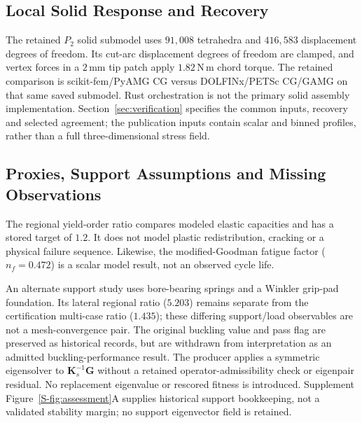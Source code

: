 \subsection{Local Solid Response and Recovery}
\label{subsec:family-solid}
\label{subsec:family-verification}
The retained $P_2$ solid submodel uses $91{,}008$ tetrahedra and $416{,}583$ displacement degrees of freedom. Its cut-arc displacement degrees of freedom are clamped, and vertex forces in a $2\,\mathrm{mm}$ tip patch apply $1.82\,\mathrm{N\,m}$ chord torque. The retained comparison is scikit-fem/PyAMG CG versus DOLFINx/PETSc CG/GAMG on that same saved submodel. Rust orchestration is not the primary solid assembly implementation. Section~\ref{sec:verification} specifies the common inputs, recovery and selected agreement; the publication inputs contain scalar and binned profiles, rather than a full three-dimensional stress field.

\subsection{Proxies, Support Assumptions and Missing Observations}
\label{subsec:family-support}
\label{subsec:family-sequence}
\label{subsec:family-fatigue}
The regional yield-order ratio compares modeled elastic capacities and has a stored target of $1.2$. It does not model plastic redistribution, cracking or a physical failure sequence. Likewise, the modified-Goodman fatigue factor ($n_f=0.472$) is a scalar model result, not an observed cycle life.

An alternate support study uses bore-bearing springs and a Winkler grip-pad foundation. Its lateral regional ratio ($5.203$) remains separate from the certification multi-case ratio ($1.435$); these differing support/load observables are not a mesh-convergence pair. The original buckling value and pass flag are preserved as historical records, but are withdrawn from interpretation as an admitted buckling-performance result. The producer applies a symmetric eigensolver to $\mathbf K_s^{-1}\mathbf G$ without a retained operator-admissibility check or eigenpair residual. No replacement eigenvalue or rescored fitness is introduced. Supplement Figure~\ref{S-fig:assessment}A supplies historical support bookkeeping, not a validated stability margin; no support eigenvector field is retained.

